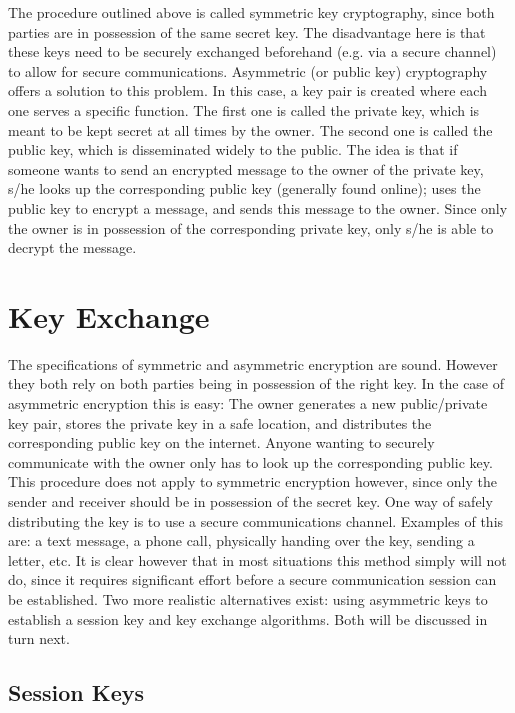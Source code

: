 The procedure outlined above is called symmetric key cryptography, since both parties are in possession of the same secret key. The disadvantage here is that these keys need to be securely exchanged beforehand (e.g. via a secure channel) to allow for secure communications. Asymmetric (or public key) cryptography offers a solution to this problem. In this case, a key pair is created where each one serves a specific function. The first one is called the private key, which is meant to be kept secret at all times by the owner. The second one is called the public key, which is disseminated widely to the public. The idea is that if someone wants to send an encrypted message to the owner of the private key, s/he looks up the corresponding public key (generally found online); uses the public key to encrypt a message, and sends this message to the owner. Since only the owner is in possession of the corresponding private key, only s/he is able to decrypt the message.

\section{Key Exchange} 
\label{sec:key_exchange}

The specifications of symmetric and asymmetric encryption are sound. However they both rely on both parties being in possession of the right key. In the case of asymmetric encryption this is easy: The owner generates a new public/private key pair, stores the private key in a safe location, and distributes the corresponding public key on the internet. Anyone wanting to securely communicate with the owner only has to look up the corresponding public key. This procedure does not apply to symmetric encryption however, since only the sender and receiver should be in possession of the secret key. One way of safely distributing the key is to use a secure communications channel. Examples of this are: a text message, a phone call, physically handing over the key, sending a letter, etc. It is clear however that in most situations this method simply will not do, since it requires significant effort before a secure communication session can be established. Two more realistic alternatives exist: using asymmetric keys to establish a session key and key exchange algorithms. Both will be discussed in turn next.

\subsection{Session Keys} 
\label{subsec:session_keys}


